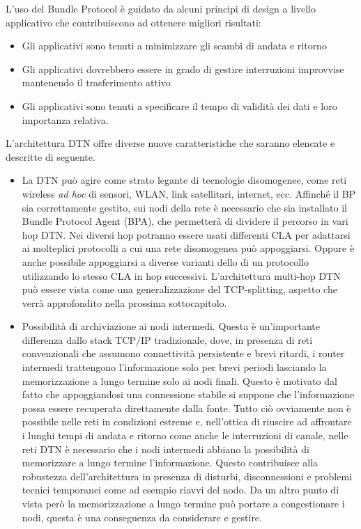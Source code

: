 \documentclass[a4paper]{article}
\begin{document}
		L'uso del Bundle Protocol è guidato da alcuni principi di design a livello applicativo che contribuiscono ad ottenere migliori risultati:
		\begin{itemize}
			\item Gli applicativi sono tenuti a minimizzare gli scambi di andata e ritorno
			\item Gli applicativi dovrebbero essere in grado di gestire interruzioni improvvise mantenendo il trasferimento attivo
			\item Gli applicativi sono tenuti a specificare il tempo di validità dei dati e loro importanza relativa.
		\end{itemize}
		
		
		L'architettura DTN offre diverse nuove caratteristiche che saranno elencate e descritte di seguente.
		\begin{itemize}
			\item La DTN può agire come strato legante di tecnologie disomogenee, come reti wireless {\it ad hoc} di sensori, WLAN, link satellitari, internet, ecc. Affinché il BP sia correttamente gestito, sui nodi della rete è necessario che sia installato il Bundle Protocol Agent (BPA), che permetterà di dividere il percorso in vari hop DTN. Nei diversi hop potranno essere usati differenti CLA per adattarsi ai molteplici protocolli a cui una rete disomogenea può appoggiarsi. Oppure è anche possibile appoggiarsi a diverse varianti dello di un protocollo utilizzando lo stesso CLA in hop successivi. L'architettura multi-hop DTN può essere vista come una generalizzazione del TCP-splitting, aspetto che verrà approfondito nella prossima sottocapitolo.
			
			\item Possibilità di archiviazione ai nodi intermedi. Questa è un'importante differenza dallo stack TCP/IP tradizionale, dove, in presenza di reti convenzionali che assumono connettività persistente e brevi ritardi, i router intermedi trattengono l'informazione solo per brevi periodi lasciando la memorizzazione a lungo termine solo ai nodi finali. Questo è motivato dal fatto che appoggiandosi una connessione stabile si suppone che l'informazione possa essere recuperata direttamente dalla fonte. Tutto ciò ovviamente non è possibile nelle reti in condizioni estreme e, nell'ottica di riuscire ad affrontare i lunghi tempi di andata e ritorno come anche le interruzioni di canale, nelle reti DTN è necessario che i nodi intermedi abbiano la possibilità di memorizzare a lungo termine l'informazione. Questo contribuisce alla robustezza dell'architettura in presenza di disturbi, disconnessioni e problemi tecnici temporanei come ad esempio riavvi del nodo. Da un altro punto di vista però la memorizzazione a lungo termine può portare a congestionare i nodi, questa è una conseguenza da considerare e gestire.
			

\end{itemize}
\end{document}
